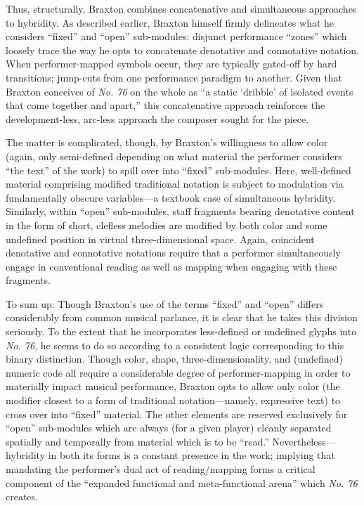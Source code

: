         Thus, structurally, Braxton combines concatenative and simultaneous approaches to hybridity. As described earlier, Braxton himself firmly delineates what he considers ``fixed'' and ``open'' sub-modules: disjunct performance ``zones'' which loosely trace the way he opts to concatenate denotative and connotative notation. When performer-mapped symbols occur, they are typically gated-off by hard transitions; jump-cuts from one performance paradigm to another. Given that Braxton conceives of \textit{No. 76} on the whole as ``a static `dribble' of isolated events that come together and apart,'' this concatenative approach reinforces the development-less, arc-less approach the composer sought for the piece.\autocite[148]{Braxton_1988} 

        The matter is complicated, though, by Braxton's willingness to allow color (again, only semi-defined depending on what material the performer considers ``the text'' of the work) to spill over into ``fixed'' sub-modules. Here, well-defined material comprising modified traditional notation is subject to modulation via fundamentally obscure variables---a textbook case of simultaneous hybridity. Similarly, within ``open'' sub-modules, staff fragments bearing denotative content in the form of short, clefless melodies are modified by both color and some undefined position in virtual three-dimensional space. Again, coincident denotative and connotative notations require that a performer simultaneously engage in conventional reading as well as mapping when engaging with these fragments.

        To sum up: Though Braxton's use of the terms ``fixed'' and ``open'' differs considerably from common musical parlance, it is clear that he takes this division seriously. To the extent that he incorporates less-defined or undefined glyphs into \textit{No. 76}, he seems to do so according to a consistent logic corresponding to this binary distinction. Though color, shape, three-dimensionality, and (undefined) numeric code all require a considerable degree of performer-mapping in order to materially impact musical performance, Braxton opts to allow only color (the modifier closest to a form of traditional notation---namely, expressive text) to cross over into ``fixed''  material. The other elements are reserved exclusively for ``open'' sub-modules which are always (for a given player) cleanly separated spatially and temporally from material which is to be ``read.'' Nevertheless---hybridity in both its forms is a constant presence in the work; implying that mandating the performer's dual act of reading/mapping forms a critical component of the ``expanded functional and meta-functional arena'' which \textit{No. 76} creates.

